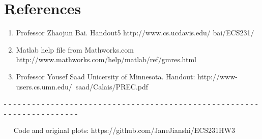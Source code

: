 \documentclass[fleqn]{article}
\begin{document}
\section{References}
\begin{enumerate}
    \item Professor Zhaojun Bai. Handout5 http://www.cs.ucdavis.edu/ bai/ECS231/
    \item Matlab help file from Mathworks.com http://www.mathworks.com/help/matlab/ref/gmres.html
    \item Professor Yousef Saad Unicersity of Minnesota. Handout: http://www-users.cs.umn.edu/~saad/Calais/PREC.pdf
\end{enumerate}


\newline
\newline
\newline
\newline
   
   
   
   
   
   

\newline
\newline
 - - - - - - - - - - - - - - - - - - - - - - - - - - - - - - - - - - - - - - - - - - - - - - - - - - - - - - - - - - - - - - - - - - - - - - 

$\quad$ Code and original plots: https://github.com/JaneJianshi/ECS231HW3
\end{document}
